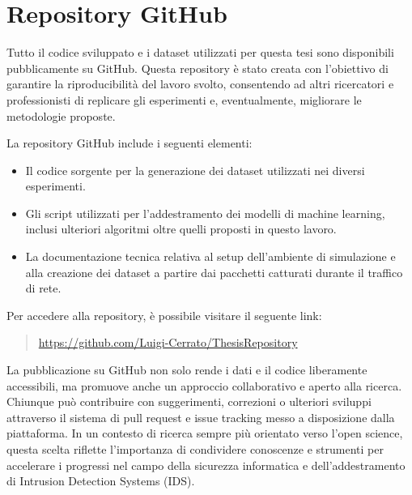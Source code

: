 

\section{Repository GitHub}

Tutto il codice sviluppato e i dataset utilizzati per questa tesi sono disponibili pubblicamente su GitHub. Questa repository è stato creata con l'obiettivo di garantire la riproducibilità del lavoro svolto, consentendo ad altri ricercatori e professionisti di replicare gli esperimenti e, eventualmente, migliorare le metodologie proposte. 

La repository GitHub include i seguenti elementi:
\begin{itemize}
    \item Il codice sorgente per la generazione dei dataset utilizzati nei diversi esperimenti.
    \item Gli script utilizzati per l'addestramento dei modelli di machine learning, inclusi ulteriori algoritmi oltre quelli proposti in questo lavoro.
    \item La documentazione tecnica relativa al setup dell'ambiente di simulazione e alla creazione dei dataset a partire dai pacchetti catturati durante il traffico di rete.
\end{itemize}
Per accedere alla repository, è possibile visitare il seguente link:

\begin{quote}
\href{https://github.com/Luigi-Cerrato/ThesisRepository}{https://github.com/Luigi-Cerrato/ThesisRepository}
\end{quote}
La pubblicazione su GitHub non solo rende i dati e il codice liberamente accessibili, ma promuove anche un approccio collaborativo e aperto alla ricerca. Chiunque può contribuire con suggerimenti, correzioni o ulteriori sviluppi attraverso il sistema di pull request e issue tracking messo a disposizione dalla piattaforma.
In un contesto di ricerca sempre più orientato verso l'open science, questa scelta riflette l'importanza di condividere conoscenze e strumenti per accelerare i progressi nel campo della sicurezza informatica e dell'addestramento di Intrusion Detection Systems (IDS).
